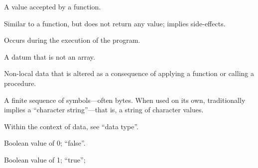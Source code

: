 \begin{description}
  A value accepted by a function.

  Similar to a function, but does not return any value; implies side-effects.

  Occurs during the execution of the program.

  A datum that is not an array.

  Non-local data that is altered as a consequence of applying a function or
  calling a procedure.

  A finite sequence of symbols---often bytes. When used on its own,
  traditionally implies a ``character string''---that is, a string of character
  values.

  Within the context of data, see ``data type''.

  \dt{$\bot$}
  Boolean value of 0; ``false''.

  \dt{$\top$}
  Boolean value of 1; ``true'';
\end{description}
